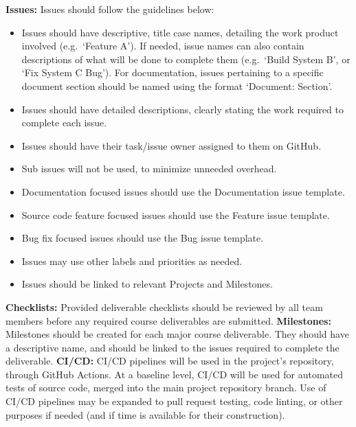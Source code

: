 \noindent \textbf{Issues:} Issues should follow the guidelines below:

\begin{itemize}
	\item Issues should have descriptive, title case names, detailing the work 
	product involved (e.g.~`Feature A'). If needed, issue names can also 
	contain descriptions of what will be done to complete them (e.g.~`Build 
	System B', or `Fix System C Bug'). For documentation, issues pertaining to 
	a specific document section should be named using the format `Document: 
	Section'.
	\item Issues should have detailed descriptions, clearly stating the work 
	required to complete each issue.
	\item Issues should have their task/issue owner assigned to them on GitHub.
	\item Sub issues will not be used, to minimize unneeded overhead.
	\item Documentation focused issues should use the Documentation issue 
	template.
	\item Source code feature focused issues should use the Feature issue 
	template.
	\item Bug fix focused issues should use the Bug issue template.
	\item Issues may use other labels and priorities as needed.
	\item Issues should be linked to relevant Projects and Milestones.
\end{itemize}

\noindent \textbf{Checklists:} Provided deliverable checklists should be 
reviewed by all team members before any required course deliverables are 
submitted.
\newline \newline
\noindent \textbf{Milestones:} Milestones should be created for each major 
course deliverable. They should have a descriptive name, and should be linked 
to the 
issues required to complete the deliverable.
\newline \newline
\noindent \textbf{CI/CD:} CI/CD pipelines will be used in the project's 
repository, through GitHub Actions. At a baseline level, CI/CD will be used for 
automated tests of source code, merged into the main project repository branch. 
Use of CI/CD pipelines may be expanded to pull request testing, code linting, 
or other purposes if needed (and if time is available for their construction).

